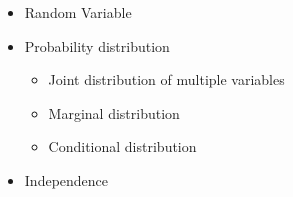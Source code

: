 \begin{resume}
\begin{itemize}
    \item Random Variable
    \item Probability distribution
    \begin{itemize}
        \item Joint distribution of multiple variables
        \item Marginal distribution
        \item Conditional distribution
    \end{itemize}
    \item Independence
\end{itemize}    
\end{resume}